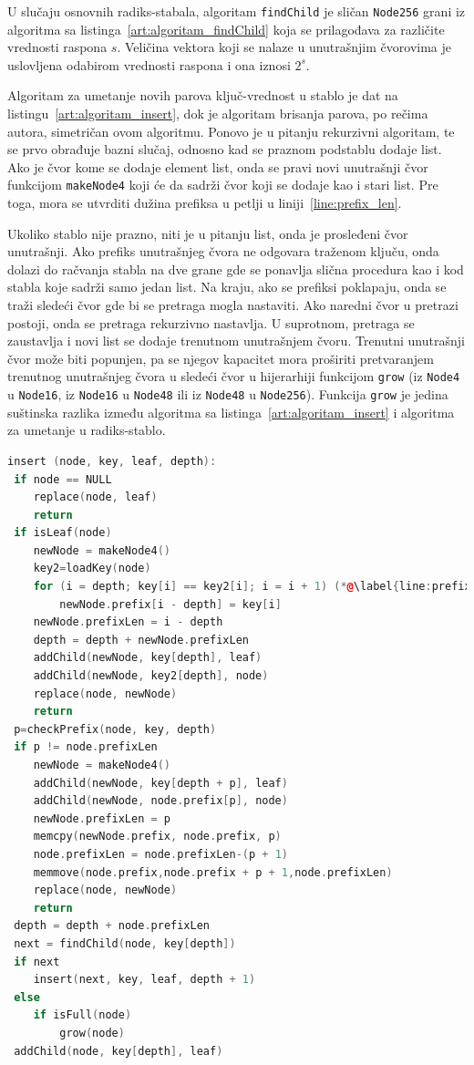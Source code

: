 \documentclass[12pt,oneside]{memoir}
\begin{document}
U slučaju osnovnih radiks-stabala, algoritam \texttt{findChild}
je sličan \texttt{Node256} grani iz
algoritma sa listinga~\ref{art:algoritam_findChild} koja
se prilagođava za različite vrednosti raspona $s$.
Veličina vektora koji se nalaze u unutrašnjim
čvorovima je uslovljena odabirom vrednosti raspona
i ona iznosi $2^{s}$.

Algoritam za umetanje novih parova ključ-vrednost u stablo je dat
na listingu~\ref{art:algoritam_insert}, dok je algoritam brisanja
parova, po rečima autora, simetričan ovom algoritmu. Ponovo je u pitanju
rekurzivni algoritam, te se prvo obrađuje bazni slučaj, odnosno kad
se praznom podstablu dodaje list. Ako je čvor kome se dodaje
element list, onda se pravi novi unutrašnji čvor funkcijom
\texttt{makeNode4} koji će da sadrži čvor koji se dodaje
kao i stari list. Pre toga, mora se utvrditi dužina prefiksa
u petlji u liniji~\ref{line:prefix_len}.

Ukoliko stablo nije prazno, niti je u pitanju list, onda je
prosleđeni čvor unutrašnji. Ako prefiks unutrašnjeg
čvora ne odgovara traženom ključu, onda dolazi do račvanja
stabla na dve grane gde se ponavlja slična procedura
kao i kod stabla koje sadrži samo jedan list. Na kraju, ako se
prefiksi poklapaju, onda se traži sledeći čvor gde bi se
pretraga mogla nastaviti. Ako naredni čvor u pretrazi postoji,
onda se pretraga rekurzivno nastavlja. U suprotnom, pretraga se
zaustavlja i novi list se dodaje trenutnom unutrašnjem čvoru.
Trenutni unutrašnji čvor može biti popunjen, pa se njegov
kapacitet mora proširiti pretvaranjem trenutnog
unutrašnjeg čvora u sledeći čvor u hijerarhiji funkcijom
\texttt{grow} (iz \texttt{Node4}
u \texttt{Node16}, iz \texttt{Node16} u \texttt{Node48} ili
iz \texttt{Node48} u \texttt{Node256}). Funkcija \texttt{grow}
je jedina suštinska razlika između algoritma sa
listinga~\ref{art:algoritam_insert} i algoritma za umetanje u
radiks-stablo.

\begin{lstlisting}[language=C++,
                   caption={Algoritam umetanja novih elemenata u stablo},
                   label={art:algoritam_insert}]
insert (node, key, leaf, depth):
 if node == NULL
    replace(node, leaf)
    return
 if isLeaf(node)
    newNode = makeNode4()
    key2=loadKey(node)
    for (i = depth; key[i] == key2[i]; i = i + 1) (*@\label{line:prefix_len}@*)
        newNode.prefix[i - depth] = key[i]
    newNode.prefixLen = i - depth
    depth = depth + newNode.prefixLen
    addChild(newNode, key[depth], leaf)
    addChild(newNode, key2[depth], node)
    replace(node, newNode)
    return
 p=checkPrefix(node, key, depth)
 if p != node.prefixLen
    newNode = makeNode4()
    addChild(newNode, key[depth + p], leaf)
    addChild(newNode, node.prefix[p], node)
    newNode.prefixLen = p
    memcpy(newNode.prefix, node.prefix, p)
    node.prefixLen = node.prefixLen-(p + 1)
    memmove(node.prefix,node.prefix + p + 1,node.prefixLen)
    replace(node, newNode)
    return
 depth = depth + node.prefixLen
 next = findChild(node, key[depth])
 if next
    insert(next, key, leaf, depth + 1)
 else
    if isFull(node)
        grow(node)
 addChild(node, key[depth], leaf)
\end{lstlisting}
\end{document}
